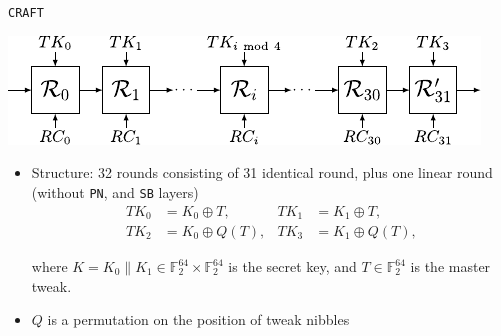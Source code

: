 \documentclass{beamer}
\begin{document}
\begin{frame}{\texttt{CRAFT}}
\begin{center}
        \includegraphics[scale = 0.9 ]{./Images/craft_structure_32r.pdf}
\end{center}
\begin{itemize}
    \item{Structure}: 32 rounds consisting of 31 identical round, plus one linear round (without \texttt{PN}, and \texttt{SB} layers)
    \begin{align*}
    TK_0&=K_0\oplus T,  & TK_1&=K_1\oplus T,\\
    TK_2&=K_0\oplus Q(T),& TK_3&=K_1\oplus Q(T),
    \end{align*}
    
    where $K = K_{0}\|K_{1}\in \mathbb{F}_{2}^{64}\times\mathbb{F}_{2}^{64}$ is the secret key, and $T\in \mathbb{F}_{2}^{64}$ is the master tweak. 
    \item $Q$ is a permutation on the position of tweak nibbles
\end{itemize}
    
\end{frame}
\end{document}
